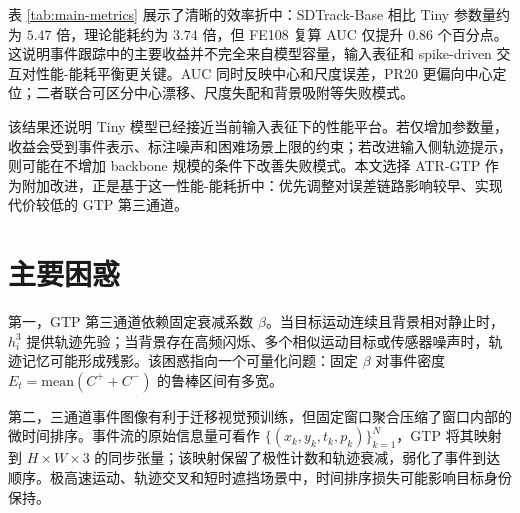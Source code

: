 \documentclass[UTF8,a4paper,zihao=-4]{ctexart}
\begin{document}
\begin{table}[H]
\centering
\small
\caption{论文指标与本文独立复算摘要。FE108/VisEvent 复算均使用公开 tracking results 与评估真值，统一由 Python evaluator 计算。}
\label{tab:main-metrics}
\end{table}

表 \ref{tab:main-metrics} 展示了清晰的效率折中：SDTrack-Base 相比 Tiny 参数量约为 $5.47$ 倍，理论能耗约为 $3.74$ 倍，但 FE108 复算 AUC 仅提升 $0.86$ 个百分点。这说明事件跟踪中的主要收益并不完全来自模型容量，输入表征和 spike-driven 交互对性能-能耗平衡更关键。AUC 同时反映中心和尺度误差，PR20 更偏向中心定位；二者联合可区分中心漂移、尺度失配和背景吸附等失败模式。

该结果还说明 Tiny 模型已经接近当前输入表征下的性能平台。若仅增加参数量，收益会受到事件表示、标注噪声和困难场景上限的约束；若改进输入侧轨迹提示，则可能在不增加 backbone 规模的条件下改善失败模式。本文选择 ATR-GTP 作为附加改进，正是基于这一性能-能耗折中：优先调整对误差链路影响较早、实现代价较低的 GTP 第三通道。

\section{主要困惑}
第一，GTP 第三通道依赖固定衰减系数 $\beta$。当目标运动连续且背景相对静止时，$h_i^3$ 提供轨迹先验；当背景存在高频闪烁、多个相似运动目标或传感器噪声时，轨迹记忆可能形成残影。该困惑指向一个可量化问题：固定 $\beta$ 对事件密度 $E_t=\mathrm{mean}(C^++C^-)$ 的鲁棒区间有多宽。

第二，三通道事件图像有利于迁移视觉预训练，但固定窗口聚合压缩了窗口内部的微时间排序。事件流的原始信息量可看作 $\{(x_k,y_k,t_k,p_k)\}_{k=1}^{N}$，GTP 将其映射到 $H\times W\times3$ 的同步张量；该映射保留了极性计数和轨迹衰减，弱化了事件到达顺序。极高速运动、轨迹交叉和短时遮挡场景中，时间排序损失可能影响目标身份保持。
\end{document}
